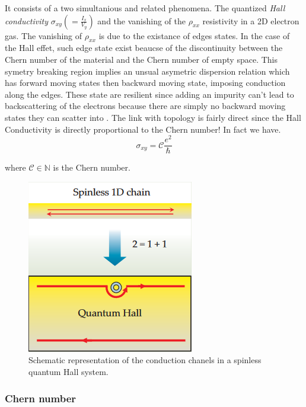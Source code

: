 It consists of a two simultanious and related phenomena. The quantized \textit{Hall conductivity} $\sigma_{xy}(=\frac{I_x}{V_y})$ and the vanishing of the $\rho_{xx}$ resistivity in a 2D electron gas. The vanishing of $\rho_{xx}$ is due to the existance of edges states.%
In the case of the Hall effet, such edge state exist beaucse of the discontinuity between the Chern number of the material and the Chern number of empty space. This symetry breaking region implies an unsual asymetric dispersion relation which has forward moving states then backward moving state, imposing conduction along the edges.\cite{kane_topological_2013} These state are resilient since adding an impurity can't lead to backscattering of the electrons because there are simply no backward moving states they can scatter into \cite{qi_quantum_2010}.  The link with topology is fairly direct since the Hall Conductivity is directly proportional to the Chern number! In fact we have.
\begin{equation}
\sigma_{xy} = \mathcal{C}\frac{e^2}{\hbar}
\end{equation}

where $\mathcal{C} \in \mathbb{N}$ is the Chern number.

\begin{figure}[h!]
    \includegraphics[scale = 0.7]{sections/visuel/spinless.png}
    \caption{Schematic representation of the conduction chanels in a spinless quantum Hall system.\cite{qi_quantum_2010}}
    \label{spinless}
\end{figure}



\subsubsection{Chern number}

